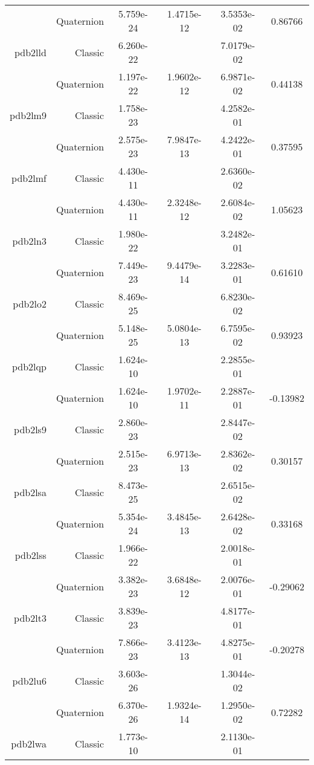 \begin{xltabular}{\textwidth}{r|rS[table-format=1.3e+2]S[table-format=1.4e+2]S[table-format=1.4e+2]S[table-format=-1.5]}
& Quaternion & 5.759e-24 & 1.4715e-12 & 3.5353e-02 & 0.86766\\  \addlinespace
pdb2lld & Classic & 6.260e-22 &  & 7.0179e-02 & \\
& Quaternion & 1.197e-22 & 1.9602e-12 & 6.9871e-02 & 0.44138\\  \addlinespace
pdb2lm9 & Classic & 1.758e-23 &  & 4.2582e-01 & \\
& Quaternion & 2.575e-23 & 7.9847e-13 & 4.2422e-01 & 0.37595\\  \addlinespace
pdb2lmf & Classic & 4.430e-11 &  & 2.6360e-02 & \\
& Quaternion & 4.430e-11 & 2.3248e-12 & 2.6084e-02 & 1.05623\\  \addlinespace
pdb2ln3 & Classic & 1.980e-22 &  & 3.2482e-01 & \\
& Quaternion & 7.449e-23 & 9.4479e-14 & 3.2283e-01 & 0.61610\\  \addlinespace
pdb2lo2 & Classic & 8.469e-25 &  & 6.8230e-02 & \\
& Quaternion & 5.148e-25 & 5.0804e-13 & 6.7595e-02 & 0.93923\\  \addlinespace
pdb2lqp & Classic & 1.624e-10 &  & 2.2855e-01 & \\
& Quaternion & 1.624e-10 & 1.9702e-11 & 2.2887e-01 & -0.13982\\  \addlinespace
pdb2ls9 & Classic & 2.860e-23 &  & 2.8447e-02 & \\
& Quaternion & 2.515e-23 & 6.9713e-13 & 2.8362e-02 & 0.30157\\  \addlinespace
pdb2lsa & Classic & 8.473e-25 &  & 2.6515e-02 & \\
& Quaternion & 5.354e-24 & 3.4845e-13 & 2.6428e-02 & 0.33168\\  \addlinespace
pdb2lss & Classic & 1.966e-22 &  & 2.0018e-01 & \\
& Quaternion & 3.382e-23 & 3.6848e-12 & 2.0076e-01 & -0.29062\\  \addlinespace
pdb2lt3 & Classic & 3.839e-23 &  & 4.8177e-01 & \\
& Quaternion & 7.866e-23 & 3.4123e-13 & 4.8275e-01 & -0.20278\\  \addlinespace
pdb2lu6 & Classic & 3.603e-26 &  & 1.3044e-02 & \\
& Quaternion & 6.370e-26 & 1.9324e-14 & 1.2950e-02 & 0.72282\\  \addlinespace
pdb2lwa & Classic & 1.773e-10 &  & 2.1130e-01 & \\

\end{xltabular}
